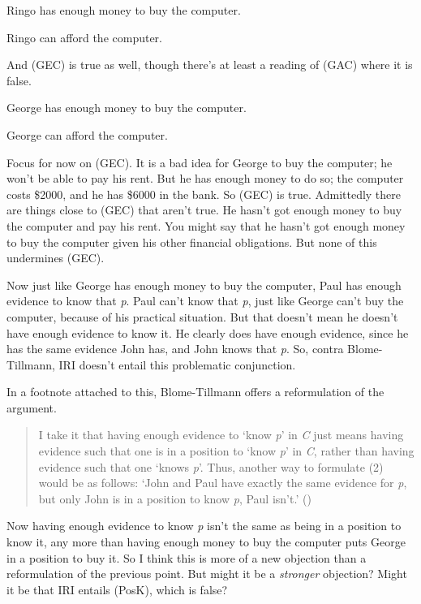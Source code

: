 \documentclass[
  11pt,
  letterpaper,
  DIV=11,
  numbers=noendperiod,
  twoside]{scrartcl}
\providecommand{\tightlist}{%
  \setlength{\itemsep}{0pt}\setlength{\parskip}{0pt}}
\begin{document}
\begin{description}
\tightlist
\item[(REC)]
Ringo has enough money to buy the computer.
\item[(RAC)]
Ringo can afford the computer.
\end{description}

And (GEC) is true as well, though there's at least a reading of (GAC)
where it is false.

\begin{description}
\tightlist
\item[(GEC)]
George has enough money to buy the computer.
\item[(GAC)]
George can afford the computer.
\end{description}

Focus for now on (GEC). It is a bad idea for George to buy the computer;
he won't be able to pay his rent. But he has enough money to do so; the
computer costs \$2000, and he has \$6000 in the bank. So (GEC) is true.
Admittedly there are things close to (GEC) that aren't true. He hasn't
got enough money to buy the computer and pay his rent. You might say
that he hasn't got enough money to buy the computer given his other
financial obligations. But none of this undermines (GEC).

Now just like George has enough money to buy the computer, Paul has
enough evidence to know that \emph{p}. Paul can't know that \emph{p},
just like George can't buy the computer, because of his practical
situation. But that doesn't mean he doesn't have enough evidence to know
it. He clearly does have enough evidence, since he has the same evidence
John has, and John knows that \emph{p}. So, contra Blome-Tillmann, IRI
doesn't entail this problematic conjunction.

In a footnote attached to this, Blome-Tillmann offers a reformulation of
the argument.

\begin{quote}
I take it that having enough evidence to `know \emph{p}' in \emph{C}
just means having evidence such that one is in a position to `know
\emph{p}' in \emph{C}, rather than having evidence such that one `knows
\emph{p}'. Thus, another way to formulate (2) would be as follows: `John
and Paul have exactly the same evidence for \emph{p}, but only John is
in a position to know \emph{p}, Paul isn't.'
()
\end{quote}

Now having enough evidence to know \emph{p} isn't the same as being in a
position to know it, any more than having enough money to buy the
computer puts George in a position to buy it. So I think this is more of
a new objection than a reformulation of the previous point. But might it
be a \emph{stronger} objection? Might it be that IRI entails (PosK),
which is false?
\end{document}
